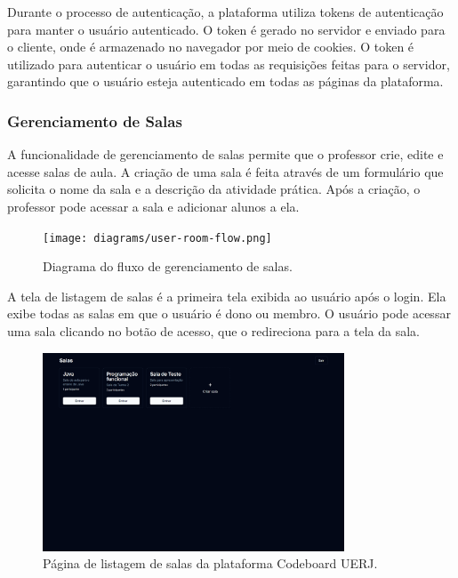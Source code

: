 Durante o processo de autenticação, a plataforma utiliza tokens de autenticação para manter o usuário autenticado. O token é gerado no servidor e enviado para o cliente, onde é armazenado no navegador por meio de cookies. O token é utilizado para autenticar o usuário em todas as requisições feitas para o servidor, garantindo que o usuário esteja autenticado em todas as páginas da plataforma.

\subsubsection{Gerenciamento de Salas}

A funcionalidade de gerenciamento de salas permite que o professor crie, edite e acesse salas de aula. A criação de uma sala é feita através de um formulário que solicita o nome da sala e a descrição da atividade prática. Após a criação, o professor pode acessar a sala e adicionar alunos a ela.

\begin{figure}[H]
    \centering
    \texttt{[image: diagrams/user-room-flow.png]}
    \caption{Diagrama do fluxo de gerenciamento de salas.}
    \label{fig:user-room-flow}
\end{figure}

A tela de listagem de salas é a primeira tela exibida ao usuário após o login. Ela exibe todas as salas em que o usuário é dono ou membro. O usuário pode acessar uma sala clicando no botão de acesso, que o redireciona para a tela da sala.

\begin{figure}[H]
    \centering
    \includegraphics[width=0.8\textwidth]{assets/codeboard/rooms-page.png}
    \caption{Página de listagem de salas da plataforma Codeboard UERJ.}
    \label{fig:rooms-page}
\end{figure}

